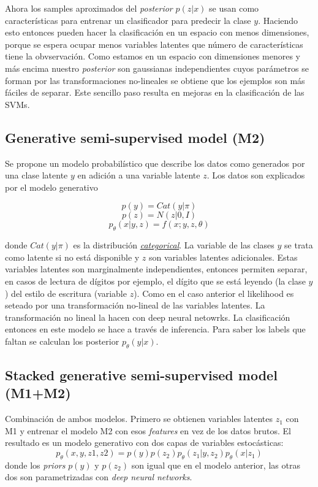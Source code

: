 \documentclass[letterpaper,11pt]{article} %
\begin{document}
	Ahora los samples aproximados del \textit{posterior} $p(z|x)$ se usan como características para entrenar un clasificador para predecir la clase $y$. Haciendo esto entonces pueden hacer la clasificación en un espacio con menos dimensiones, porque se espera ocupar menos variables latentes que número de características tiene la obvservación.
	Como estamos en un espacio con dimensiones menores y más encima nuestro \textit{posterior} son gaussianas independientes cuyos parámetros se forman por las transformaciones no-lineales se obtiene que los ejemplos son más fáciles de separar. Este sencillo paso resulta en mejoras en la clasificación de las SVMs.
	
\subsection{Generative semi-supervised model (M2)}

	Se propone un modelo probabilístico que describe los datos como generados por una clase latente $y$ en adición a una variable latente $z$. Los datos son explicados por el modelo generativo
	
	$$ p(y) = Cat(y|\pi) $$
	$$ p(z) = N(z|0,I) $$
	$$ p_{\theta}(x|y,z) = f(x;y,z,\theta) $$
	
	donde $Cat(y|\pi)$ es la distribución \href{https://en.wikipedia.org/wiki/Categorical_distribution}{\textit{categorical}}. La variable de las clases $y$ se trata como latente si no está disponible y $z$ son variables latentes adicionales. Estas variables latentes son marginalmente independientes, entonces permiten separar, en casos de lectura de dígitos por ejemplo, el dígito que se está leyendo (la clase $y$) del estilo de escritura (variable $z$).   
	Como en el caso anterior el likelihood es seteado por una transformación no-lineal de las variables latentes. La transformación no lineal la hacen con deep neural netowrks.  
	La clasificación entonces en este modelo se hace a través de inferencia. Para saber los labels que faltan se calculan los posterior $p_{\theta}(y|x)$.
	
\subsection{Stacked generative semi-supervised model (M1+M2)}

	Combinación de ambos modelos. Primero se obtienen variables latentes $z_{1}$ con M1 y entrenar el modelo M2 con esos \textit{features} en vez de los datos brutos. El resultado es un modelo generativo con dos capas de variables estocásticas:
	$$ p_{\theta}(x,y,z1,z2) = p(y)p(z_{2})p_{\theta}(z_{1}|y,z_{2})p_{\theta}(x|z_{1}) $$
	donde los \textit{priors} $p(y)$ y $p(z_{2})$ son igual que en el modelo anterior, las otras dos son parametrizadas con \textit{deep neural networks}.
	
\end{document}
